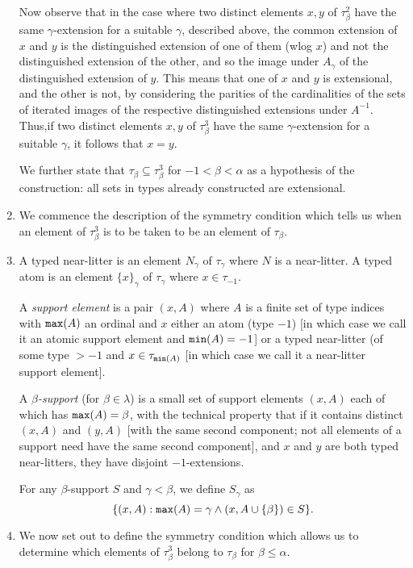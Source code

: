 \documentclass[12pt]{article}
\begin{document}
\begin{enumerate}
Now observe that in the case where two distinct elements $x,y$ of $\tau^2_\beta$ have the same $\gamma$-extension for a suitable $\gamma$, described above,
the common extension of $x$ and $y$ is the distinguished extension of one of them (wlog $x$) and not the distinguished extension of the other, and so the image under $A_\gamma$ of the distinguished extension of $y$.  This means that one of $x$ and $y$ is extensional, and the other is not, by considering the parities of the cardinalities of the sets of iterated images of the respective distinguished extensions under $A^{-1}$.  Thus,if  two distinct elements $x,y$ of $\tau^3_\beta$ have the same $\gamma$-extension for a suitable $\gamma$, it follows that $x=y$.

We further state that $\tau_\beta \subseteq \tau^3_\beta$ for $-1 < \beta < \alpha$ as a hypothesis of the construction:  all sets in types already constructed are extensional.

\item  We commence the description of the symmetry condition which tells us when an element of $\tau^3_\beta$ is to be taken to be an element of $\tau_\beta$.

\item  A typed near-litter is an element $N_\gamma$ of $\tau_\gamma$ where $N$ is a near-litter.  A typed atom is an element $\{x\}_\gamma$ of $\tau_\gamma$ where
$x \in \tau_{-1}$.

A {\em support element\/} is a pair $(x,A)$ where $A$ is a finite set of type indices with ${\tt max}(A)$ an ordinal and  $x$ either an atom (type $-1$) [in which case we call it an atomic support element and ${\tt min}(A) =-1$] or a typed near-litter (of some type $>-1$ and $x \in \tau_{{\tt min}(A)}$ [in which case we call it a near-litter support element].

A {\em $\beta$-support\/} (for $\beta \in \lambda$) is a small set of support elements $(x,A)$ each of which has ${\tt max}(A)=\beta$, with the technical property that if it contains distinct $(x,A)$ and $(y,A)$ [with the same second component;  not all elements of a support need have the same second component], and $x$ and $y$ are both typed near-litters, they have disjoint $-1$-extensions.

For any $\beta$-support $S$ and $\gamma<\beta$, we define $S_\gamma$ as $$\{(x,A):{\tt max}(A)=\gamma \wedge (x,A\cup \{\beta\}) \in S\}.$$

\item  We now set out to define the symmetry condition which allows us to determine which elements of $\tau^3_\beta$ belong to $\tau_\beta$ for $\beta\leq \alpha$.


\end{enumerate}
\end{document}
